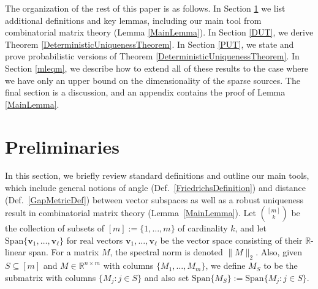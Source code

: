 \documentclass[journal, onecolumn]{IEEEtran}
\begin{document}

The organization of the rest of this paper is as follows. In Section \ref{Preliminaries} we list additional definitions and key lemmas, including our main tool from combinatorial matrix theory (Lemma \ref{MainLemma}). In Section \ref{DUT}, we derive Theorem \ref{DeterministicUniquenessTheorem}. In Section \ref{PUT}, we state and prove probabilistic versions of Theorem \ref{DeterministicUniquenessTheorem}. In Section \ref{mleqm}, we describe how to extend all of these results to the case where we have only an upper bound on the dimensionality of the sparse sources. The final section is a discussion, and an appendix contains the proof of Lemma \ref{MainLemma}.


\section{Preliminaries}\label{Preliminaries}
In this section, we briefly review standard definitions and outline our main tools, which include general notions of angle (Def.~\ref{FriedrichsDefinition}) and distance (Def.~\ref{GapMetricDef}) between vector subspaces as well as a robust uniqueness result in combinatorial matrix theory (Lemma~\ref{MainLemma}).
Let ${[m] \choose k}$ be the collection of subsets of $[m] := \{1,\ldots,m\}$ of cardinality $k$, and let $\text{Span}\{\mathbf{v}_1, \ldots, \mathbf{v}_\ell\}$ for real vectors $\mathbf{v}_1, \ldots, \mathbf{v}_\ell$ be the vector space consisting of their $\mathbb{R}$-linear span.  For a matrix $M$, the spectral norm is denoted $\|M\|_2$.
%
%
Also, given $S \subseteq [m]$ and $M \in \mathbb{R}^{n \times m}$ with columns $\{M_1,\ldots,M_m\}$, we define $M_S$ to be the submatrix with columns $\{M_j: j \in S\}$ and also set $\text{Span}\{M_S\} := \text{Span}\{M_j : j \in S\}$.  
\end{document}
